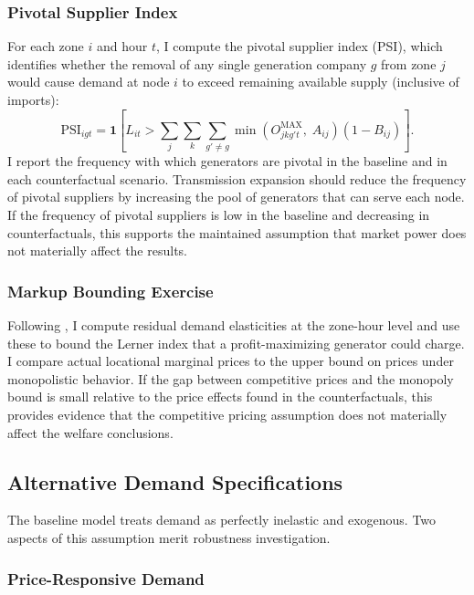 \documentclass[12pt]{article}
\begin{document}
\subsubsection{Pivotal Supplier Index}

For each zone $i$ and hour $t$, I compute the pivotal supplier index (PSI), which identifies whether the removal of any single generation company $g$ from zone $j$ would cause demand at node $i$ to exceed remaining available supply (inclusive of imports):
\begin{equation}
    \text{PSI}_{igt} = \mathbf{1}\left[L_{it} > \sum_{j} \sum_{k} \sum_{g' \neq g} \min\left(O^{\text{MAX}}_{jkg't},\; A_{ij}\right)(1 - B_{ij})\right].
\end{equation}
I report the frequency with which generators are pivotal in the baseline and in each counterfactual scenario. Transmission expansion should reduce the frequency of pivotal suppliers by increasing the pool of generators that can serve each node. If the frequency of pivotal suppliers is low in the baseline and decreasing in counterfactuals, this supports the maintained assumption that market power does not materially affect the results.

\subsubsection{Markup Bounding Exercise}

Following \cite{borenstein2002measuring}, I compute residual demand elasticities at the zone-hour level and use these to bound the Lerner index that a profit-maximizing generator could charge. I compare actual locational marginal prices to the upper bound on prices under monopolistic behavior. If the gap between competitive prices and the monopoly bound is small relative to the price effects found in the counterfactuals, this provides evidence that the competitive pricing assumption does not materially affect the welfare conclusions.


\subsection{Alternative Demand Specifications}\label{app:robustness:demand}

The baseline model treats demand as perfectly inelastic and exogenous. Two aspects of this assumption merit robustness investigation.

\subsubsection{Price-Responsive Demand}
\end{document}
